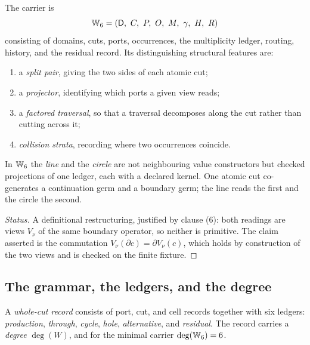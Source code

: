 \begin{definition}\label{def:w6}
The carrier is
\[
  \bW_6=(\mathsf D,\ C,\ P,\ O,\ M,\ \gamma,\ H,\ R)
\]
consisting of domains, cuts, ports, occurrences, the multiplicity ledger, routing, history,
and the residual record.  Its distinguishing structural features are:
\begin{enumerate}
\item a \emph{split pair}, giving the two sides of each atomic cut;
\item a \emph{projector}, identifying which ports a given view reads;
\item a \emph{factored traversal}, so that a traversal decomposes along the cut rather than
  cutting across it;
\item \emph{collision strata}, recording where two occurrences coincide.
\end{enumerate}
\end{definition}

\begin{proposal}\label{prop:line-circle-views}
In $\mathbb{W}_6$ the \emph{line} and the \emph{circle} are not neighbouring value constructors but
checked projections of one ledger, each with a declared kernel.  One atomic cut
co-generates a continuation germ and a boundary germ; the line reads the first and the
circle the second.
\end{proposal}

\begin{proof}[Status]
A definitional restructuring, justified by clause (6): both readings are views
$V_\nu$ of the same boundary operator, so neither is primitive.  The claim asserted is the
commutation $V_\nu(\partial c)=\partial V_\nu(c)$, which holds by construction of the two
views and is checked on the finite fixture.
\end{proof}

\subsection{The grammar, the ledgers, and the degree}

\begin{definition}\label{def:whole-cut-record}
A \emph{whole-cut record} consists of port, cut, and cell records together with six ledgers:
\emph{production}, \emph{through}, \emph{cycle}, \emph{hole}, \emph{alternative}, and
\emph{residual}.  The record carries a \emph{degree} $\deg(W)$, and for the minimal carrier
$\deg(\mathbb{W}_6)=6$.
\end{definition}

